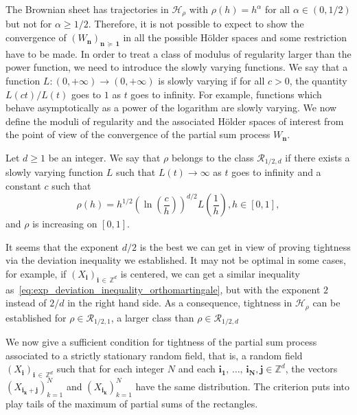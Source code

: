 \documentclass[AHL,Unicode,longabstracts,published]{cedram}
\newcommand{\Hca}{\mathcal{H}}
\newcommand{\Rca}{\mathcal{R}}
\newcommand\Z{\mathbb{Z}}
\newcommand{\pr}[1]{(#1)}
\newcommand{\gr}[1]{\bm{#1}}
\newcommand{\gri}{\bm{i}}
\newcommand{\grj}{\bm{j}}
\newcommand{\grn}{\bm{n}}
\newcommand{\smd}{\succcurlyeq }
\begin{document}
The Brownian sheet has trajectories in $\Hca_\rho$ with $\rho\pr{h} =h^\alpha$ for all $\alpha \in\pr{0,1/2}$ but not for $\alpha\geq 1/2$. Therefore, it is not possible to expect to show the convergence of $\pr{W_{\grn}}_{\grn\,\smd\,\gr{1}}$ in all the possible H\"older spaces and some restriction have to be made. In order to treat a class of modulus of regularity larger than the power function, we need to introduce the slowly varying functions. We say that a function $L\colon \pr{0,+\infty}\to \pr{0,+\infty}$ is slowly varying if for all $c>0$, the quantity $L\pr{ct}/L\pr{t}$ goes to $1$ as $t$ goes to infinity. For example, functions which behave asymptotically as a power of the logarithm are slowly varying. We now define the moduli of regularity and the associated H\"older spaces of interest from the point of view of the convergence of the partial sum process $W_{\grn}$.

\begin{defi}
Let $d\geq 1$ be an integer. We say that $\rho$ belongs to the class $\Rca_{1/2,d}$ if there exists a slowly varying function $L$ such that $L\pr{t}\to \infty$ as $t$ goes to infinity and a constant $c$ such that
\begin{equation}\label{eq:def_de_rho}
\rho\pr{h}=h^{1/2}\left(\ln\left(\frac{c}{h}\right)\right)^{d/2}L\left(\frac 1h\right), h
\in [0,1],
\end{equation}
and $\rho $ is increasing on $[0,1]$.
\end{defi}

It seems that the exponent $d/2$ is the best we can get in view of proving tightness via the deviation inequality we established. It may not be optimal in some cases, for example, if $\pr{X_{\gri}}_{\gri\,\in\,\Z^d}$ is centered, we can get a similar inequality as~\eqref{eq:exp_deviation_inequality_orthomartingale}, but with the exponent $2$ instead of $2/d$ in the right hand side. As a consequence, tightness in $\Hca_{\rho}$ can be established for $\rho\in\Rca_{1/2,1}$, a larger class than $\rho\in\Rca_{1/2,d}$


We now give a sufficient condition for tightness of the partial sum process associated to a strictly stationary random field, that is, a random field $\pr{X_{\gri}}_{\gri\,\in\,\Z^d}$ such that for each integer $N$ and each $\gr{i_1},\,\dots,\,\gr{i_N},\gr{j}\in\Z^d$, the vectors $\pr{X_{\gr{i_k}+\grj}}_{k=1}^N$ and $\pr{X_{\gr{i_k}}}_{k=1}^N$ have the same distribution. The criterion puts into play tails of the maximum of partial sums of the rectangles.
\end{document}
